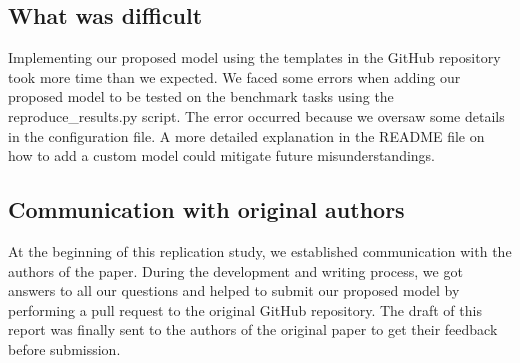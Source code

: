 \subsection{What was difficult}


Implementing our proposed model using the templates in the GitHub repository took more time than we expected. We faced some errors when adding our proposed model to be tested on the benchmark tasks using the reproduce\_results.py script. The error occurred because we oversaw some details in the configuration file. A more detailed explanation in the README file on how to add a custom model could mitigate future misunderstandings. 



\subsection{Communication with original authors}

At the beginning of this replication study, we established communication with the authors of the paper. During the development and writing process, we got answers to all our questions and helped to submit our proposed model by performing a pull request to the original GitHub repository. The draft of this report was finally sent to the authors of the original paper to get their feedback before submission. 
